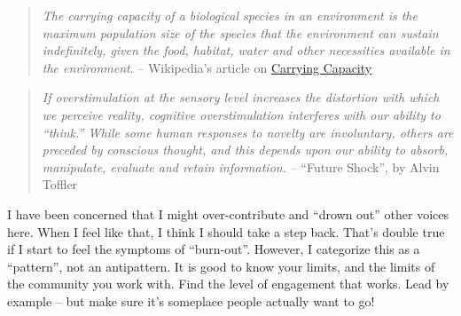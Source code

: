 \begin{quote}
\emph{The carrying capacity of a biological species in an environment is
the maximum population size of the species that the environment can
sustain indefinitely, given the food, habitat, water and other
necessities available in the environment}. -- Wikipedia's article on
\href{http://en.wikipedia.org/wiki/Carrying\_capacity}{Carrying
Capacity}
\end{quote}

\begin{quote}
\emph{If overstimulation at the sensory level increases the distortion
with which we perceive reality, cognitive overstimulation interferes
with our ability to ``think.'' While some human responses to novelty are
involuntary, others are preceded by conscious thought, and this depends
upon our ability to absorb, manipulate, evaluate and retain
information.} -- ``Future Shock'', by Alvin Toffler
\end{quote}

I have been concerned that I might over-contribute and ``drown out''
other voices here. When I feel like that, I think I should take a step
back. That's double true if I start to feel the symptoms of
``burn-out''. However, I categorize this as a ``pattern'', not an
antipattern. It is good to know your limits, and the limits of the
community you work with. Find the level of engagement that works. Lead
by example -- but make sure it's someplace people actually want to go!
